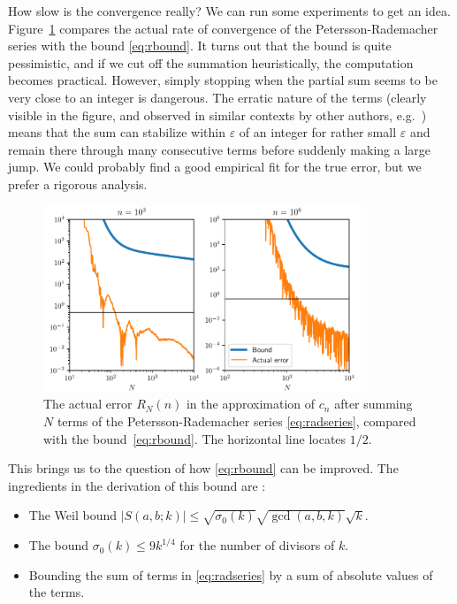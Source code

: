\documentclass{amsart}
\theoremstyle{definition}
\theoremstyle{remark}
\begin{document}
How slow is the convergence really? We can run some experiments to get an idea.
Figure~\ref{fig:errplot} compares the actual rate of convergence of
the Petersson-Rademacher series with the bound \eqref{eq:rbound}.
It turns out that the bound is quite pessimistic,
and if we cut off the summation heuristically,
the computation becomes practical.
However, simply stopping when the partial sum seems to be
very close to an integer is dangerous. The erratic nature of the terms
(clearly visible in the figure, and observed in similar
contexts by other authors, e.g.~\cite{McLaughlin2012})
means that the sum can stabilize within $\varepsilon$ of an integer
for rather small $\varepsilon$ and remain there through many consecutive terms before suddenly
making a large jump. We could probably find a good empirical fit
for the true error, but we prefer a rigorous analysis.

\begin{figure}[h]
\centering
\includegraphics[width=0.85\textwidth]{error}
\caption{The actual error $R_N(n)$ in the approximation of $c_n$ after summing $N$ terms of the Petersson-Rademacher series \eqref{eq:radseries}, compared with the bound~\eqref{eq:rbound}. The horizontal line locates $1/2$.}
\label{fig:errplot}
\end{figure}

This brings us to the question of how \eqref{eq:rbound} can be
improved.
The ingredients in the derivation of this bound are \cite[Section 5.1]{Brisebarre2005}:
\begin{itemize}
\item The Weil bound $|S(a,b;k)| \le \sqrt{\sigma_0(k)} \sqrt{\gcd(a,b,k)} \sqrt{k}$.
\item The bound $\sigma_0(k) \le 9k^{1/4}$ for the number of divisors of $k$.
\item Bounding the sum of terms in \eqref{eq:radseries} by a sum of absolute values of the terms.
\end{itemize}
\end{document}
